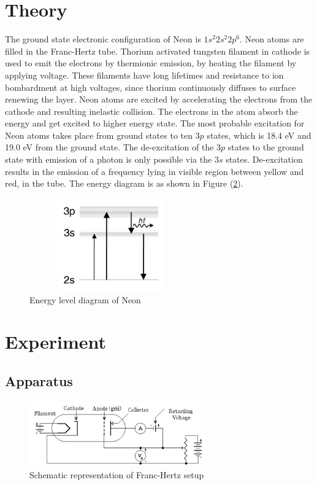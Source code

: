 \documentclass[a4paper, amsfonts, amssymb, amsmath, reprint, showkeys, nofootinbib, twoside]{revtex4-1}
\begin{document}
\section{Theory}\label{theo}
The ground state electronic configuration of Neon is $1s^{2}2s^{2}2p^{6}$. Neon atoms are filled in the Franc-Hertz tube. Thorium activated tungsten filament in cathode is used to emit the electrons by thermionic emission, by heating the filament by applying voltage. These filaments have long lifetimes and resistance to ion bombardment at high voltages, since thorium continuously diffuses to surface renewing the layer. 
Neon atoms are excited by accelerating the electrons from the cathode and resulting inelastic collision. The electrons in the atom absorb the energy and get excited to higher energy state. The most probable excitation for Neon atoms takes place from ground states to ten $3p$ states, which is 18.4 eV and 19.0 eV from the ground state. The de-excitation of the $3p$ states to the ground state with emission of a photon is only possible via the $3s$ states. De-excitation results in the emission of a frequency lying in visible region between yellow and red, in the tube. The energy diagram is as shown in Figure (\ref{ed}).

\begin{figure}[htbp] %
   \centering
   \includegraphics[width=7cm,height=4cm]{ed} 
   \caption{Energy level diagram of Neon}
   \label{ed}
\end{figure}

\section{Experiment}

\subsection{Apparatus}
\begin{figure}[H] %
   \centering
   \includegraphics[width=3in]{ap} 
   \caption{Schematic representation of Franc-Hertz setup}
   \label{ed}
\end{figure}
\end{document}
